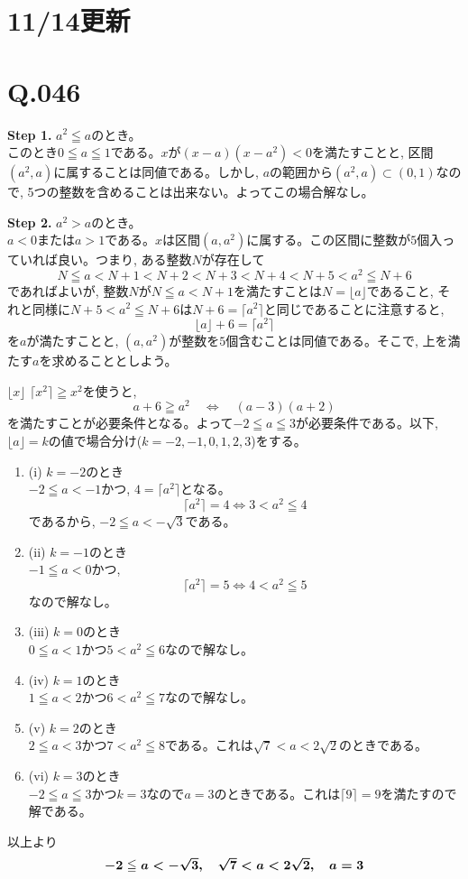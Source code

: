 \documentclass[twocolumn]{jbook}
\newcommand{\bolm}[1]{{\mbox{\boldmath $#1$}}}
\newcommand{\dou}{\Leftrightarrow}
\newcommand{\ben}{\begin{enumerate}}
\newcommand{\een}{\end{enumerate}}
\renewcommand{\leq}{\leqq}
\renewcommand{\geq}{\geqq}
\begin{document}
\section*{11/14更新}
\section*{Q.046}
\textbf{Step 1.} $a^2\leq a$のとき。\\
このとき$0\leq a\leq 1$である。$x$が$(x-a)(x-a^2)<0$を満たすことと, 区間$(a^2,a)$に属することは同値である。しかし, $a$の範囲から$(a^2,a)\subset (0,1)$なので, 5つの整数を含めることは出来ない。よってこの場合解なし。

\textbf{Step 2.} $a^2>a$のとき。\\
$a<0$または$a>1$である。$x$は区間$(a,a^2)$に属する。この区間に整数が$5$個入っていれば良い。つまり, ある整数$N$が存在して
\[N\leq a < N+1<N+2<N+3<N+4<N+5<a^2\leq N+6\]
であればよいが, 整数$N$が$N\leq a<N+1$を満たすことは$N=\lfloor a\rfloor$であること, それと同様に$N+5<a^2\leq N+6$は$N+6=\lceil a^2 \rceil$と同じであることに注意すると, 
\[\lfloor a\rfloor + 6 = \lceil a^2\rceil\]
を$a$が満たすことと, $(a,a^2)$が整数を$5$個含むことは同値である。そこで, 上を満たす$a$を求めることとしよう。\par
$\lfloor x\rfloor$ $\lceil x^2 \rceil \geq x^2 $を使うと,
\[a + 6\geq a^2\quad \dou \quad (a-3)(a+2)\]
を満たすことが必要条件となる。よって$-2\leq a\leq 3$が必要条件である。以下, $\lfloor a\rfloor=k$の値で場合分け($k=-2,-1,0,1,2,3$)をする。
\ben
\item[(i)] $k=-2$のとき\\
$-2\leq a<-1$かつ, $4=\lceil a^2\rceil$となる。
\[\lceil a^2\rceil =4 \dou 3< a^2 \leq 4\]
であるから, $-2\leq a < -\sqrt{3}$である。
\item[(ii)] $k=-1$のとき\\
$-1\leq a<0$かつ,
\[\lceil a^2\rceil = 5 \dou 4< a^2\leq 5\]
なので解なし。
\item[(iii)] $k=0$のとき\\
$0\leq a<1$かつ$5<a^2\leq 6$なので解なし。
\item[(iv)] $k=1$のとき\\
$1\leq a<2$かつ$6<a^2\leq 7$なので解なし。\\
\item[(v)] $k=2$のとき\\
$2\leq a<3$かつ$7<a^2\leq 8$である。これは$\sqrt{7} < a < 2\sqrt{2}$のときである。
\item[(vi)] $k=3$のとき\\
$-2\leq a\leq 3$かつ$k=3$なので$a=3$のときである。これは$\lceil 9 \rceil = 9$を満たすので解である。
\een
以上より
\[\bolm{ -2\leq a<-\sqrt{3},\quad \sqrt{7}<a<2\sqrt{2},\quad a=3 }\]
\end{document}
